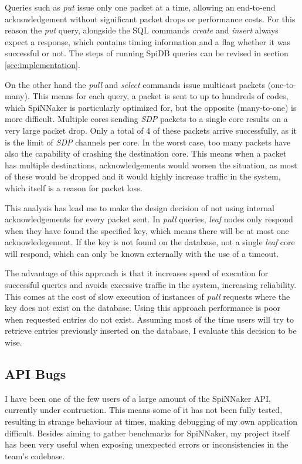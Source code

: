 Queries such as \textit{put} issue only one packet at a time, allowing an end-to-end acknowledgement without significant packet drops or performance costs. For this reason the \textit{put} query, alongside the SQL commands \textit{create} and \textit{insert} always expect a response, which contains timing information and a flag whether it was successful or not. The steps of running SpiDB queries can be revised in section \ref{sec:implementation}.

On the other hand the \textit{pull} and \textit{select} commands issue multicast packets (one-to-many). This means for each query, a packet is sent to up to hundreds of codes, which SpiNNaker is particularly optimized for, but the opposite (many-to-one) is more difficult. Multiple cores sending \textit{SDP} packets to a single core results on a very large packet drop. Only a total of 4 of these packets arrive successfully, as it is the limit of \textit{SDP} channels per core. In the worst case, too many packets have also the capability of crashing the destination core.
This means when a packet has multiple destinations, acknowledgements would worsen the situation, as most of these would be dropped and it would highly increase traffic in the system, which itself is a reason for packet loss.

This analysis has lead me to make the design decision of not using internal acknowledgements for every packet sent. In \textit{pull} queries, \textit{leaf} nodes only respond when they have found the specified key, which means there will be at most one acknowledegement. If the key is not found on the database, not a single \textit{leaf} core will respond, which can only be known externally with the use of a timeout.

The advantage of this approach is that it increases speed of execution for successful queries and avoids excessive traffic in the system, increasing reliability. This comes at the cost of slow execution of instances of \textit{pull} requests where the key does not exist on the database. Using this approach performance is poor when requested entries do not exist. Assuming most of the time users will try to retrieve entries previously inserted on the database, I evaluate this decision to be wise.

\subsection{API Bugs}
I have been one of the few users of a large amount of the SpiNNaker API, currently under contruction. This means some of it has not been fully tested, resulting in strange behaviour at times, making debugging of my own application difficult. Besides aiming to gather benchmarks for SpiNNaker, my project itself has been very useful when exposing unexpected errors or inconsistencies in the team's codebase.

